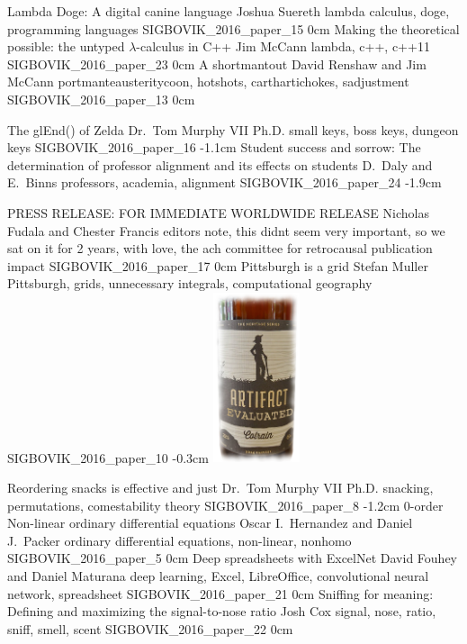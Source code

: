 \addpaper
	{Lambda Doge: A digital canine language}
	{Joshua Suereth}
	{lambda calculus, doge, programming languages}
	{SIGBOVIK_2016_paper_15}
	{0cm}
	{}
\addpaper
	{Making the theoretical possible: the untyped $\lambda$-calculus in C++}
	{Jim McCann}
	{lambda, c++, c++11}
	{SIGBOVIK_2016_paper_23}
	{0cm}
	{}
\addpaper
	{A shortmantout}
	{David Renshaw and Jim McCann}
	{portmanteausteritycoon, hotshots, carthartichokes, sadjustment}
	{SIGBOVIK_2016_paper_13}
	{0cm}
	{}

\addpaper
	{The glEnd() of Zelda}
	{Dr.\ Tom Murphy VII Ph.D.}
	{small keys, boss keys, dungeon keys}
	{SIGBOVIK_2016_paper_16}
	{-1.1cm}
	{}
\addpaper
	{Student success and sorrow: The determination of professor alignment and its effects on students}
	{D.\ Daly and E.\ Binns}
	{professors, academia, alignment}
	{SIGBOVIK_2016_paper_24}
	{-1.9cm}
	{}

\addpaper
	{PRESS RELEASE: FOR IMMEDIATE WORLDWIDE RELEASE}
	{Nicholas Fudala and Chester Francis}
	{editors note, this didnt seem very important, so we sat on it for 2 years, with love, the ach committee for retrocausal publication impact}
	{SIGBOVIK_2016_paper_17}
	{0cm}
	{}
\addpaper
	{Pittsburgh is a grid}
	{Stefan Muller}
	{Pittsburgh, grids, unnecessary integrals, computational geography}
	{SIGBOVIK_2016_paper_10}
	{-0.3cm}
	{\includegraphics[width=1in]{eval}}

\addpaper
	{Reordering snacks is effective and just}
	{Dr.\ Tom Murphy VII Ph.D.}
	{snacking, permutations, comestability theory}
	{SIGBOVIK_2016_paper_8}
	{-1.2cm}
	{}
\addpaper
	{0-order Non-linear ordinary differential equations}
	{Oscar I.\ Hernandez and Daniel J.\ Packer}
	{ordinary differential equations, non-linear, nonhomo}
	{SIGBOVIK_2016_paper_5}
	{0cm}
	{}
\addpaper
	{Deep spreadsheets with ExcelNet}
	{David Fouhey and Daniel Maturana}
	{deep learning, Excel, LibreOffice, convolutional neural network, spreadsheet}
	{SIGBOVIK_2016_paper_21}
	{0cm}
	{}
\addpaper
	{Sniffing for meaning: Defining and maximizing the signal-to-nose ratio}
	{Josh Cox}
	{signal, nose, ratio, sniff, smell, scent}
	{SIGBOVIK_2016_paper_22}
	{0cm}
	{}

